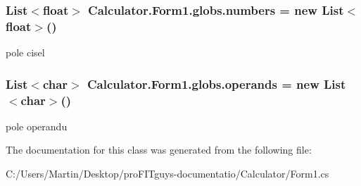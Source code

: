 \subsubsection[{\texorpdfstring{numbers}{numbers}}]{\setlength{\rightskip}{0pt plus 5cm}List$<$float$>$ Calculator.\+Form1.\+globs.\+numbers = new List$<$float$>$()}\hypertarget{class_calculator_1_1_form1_1_1globs_a43533d815e869c1c69a675663a553cc7}{}\label{class_calculator_1_1_form1_1_1globs_a43533d815e869c1c69a675663a553cc7}


pole cisel 

\subsubsection[{\texorpdfstring{operands}{operands}}]{\setlength{\rightskip}{0pt plus 5cm}List$<$char$>$ Calculator.\+Form1.\+globs.\+operands = new List$<$char$>$()}\hypertarget{class_calculator_1_1_form1_1_1globs_a801693dfdbcc3eab7b9732224c021895}{}\label{class_calculator_1_1_form1_1_1globs_a801693dfdbcc3eab7b9732224c021895}


pole operandu 



The documentation for this class was generated from the following file\+:\begin{DoxyCompactItemize}
\item 
C\+:/\+Users/\+Martin/\+Desktop/pro\+F\+I\+Tguys-\/documentatio/\+Calculator/Form1.\+cs\end{DoxyCompactItemize}
